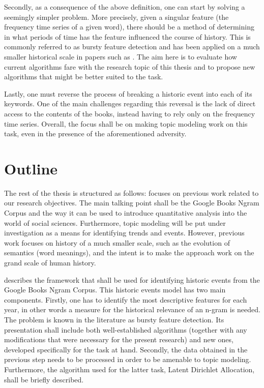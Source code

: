 Secondly, as a consequence of the above definition, one can start by solving a seemingly simpler problem. More precisely, given a singular feature (the frequency time series of a given word), there should be a method of determining in what periods of time has the feature influenced the course of history. This is commonly referred to as bursty feature detection and has been applied on a much smaller historical scale in papers such as \cite{Kleinberg:2002:BHS:775047.775061}. The aim here is to evaluate how current algorithms fare with the research topic of this thesis and to propose new algorithms that might be better suited to the task.

Lastly, one must reverse the process of breaking a historic event into each of its keywords. One of the main challenges regarding this reversal is the lack of direct access to the contents of the books, instead having to rely only on the frequency time series. Overall, the focus shall be on making topic modeling work on this task, even in the presence of the aforementioned adversity.

\section{Outline}
\label{sec:outline}

The rest of the thesis is structured as follows:  focuses on previous work related to our research objectives. The main talking point shall be the Google Books Ngram Corpus and the way it can be used to introduce quantitative analysis into the world of social sciences. Furthermore, topic modeling will be put under investigation as a means for identifying trends and events. However, previous work focuses on history of a much smaller scale, such as the evolution of semantics (word meanings), and the intent is to make the approach work on the grand scale of human history.

 describes the framework that shall be used for identifying historic events from the Google Books Ngram Corpus. This historic events model has two main components. Firstly, one has to identify the most descriptive features for each year, in other words a measure for the historical relevance of an n-gram is needed. The problem is known in the literature as bursty feature detection. Its presentation shall include both well-established algorithms (together with any modifications that were necessary for the present research) and new ones, developed specifically for the task at hand. Secondly, the data obtained in the previous step needs to be processed in order to be amenable to topic modeling. Furthermore, the algorithm used for the latter task, Latent Dirichlet Allocation, shall be briefly described.

